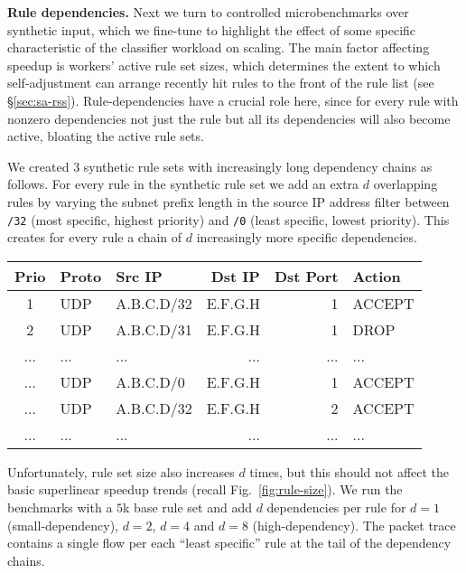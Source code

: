 \noindent%
\textbf{Rule dependencies.} %
Next we turn to controlled microbenchmarks over synthetic input, which we fine-tune to highlight the effect of some specific characteristic of the classifier workload on scaling. The main factor affecting speedup is workers' active rule set sizes, which determines the extent to which self-adjustment can arrange recently hit rules to the front of the rule list (see \S\ref{sec:sa-rss}). Rule-dependencies have a crucial role here, since for every rule with nonzero dependencies not just the rule but all its dependencies will also become active, bloating the active rule sets.

We created 3 synthetic rule sets with increasingly long dependency chains as follows. For every rule in the synthetic rule set we add an extra $d$ overlapping rules by varying the subnet prefix length in the source IP address filter between \texttt{/32} (most specific, highest priority) and \texttt{/0} (least specific, lowest priority). This creates for every rule a chain of $d$ increasingly more specific dependencies.

\noindent %
\begin{small}
  \addtolength{\tabcolsep}{-1pt}    
  \begin{tabular}{c|l|l|r|r|l}
    \textbf{Prio} & \textbf{Proto} & \textbf{Src IP} & \textbf{Dst IP} & \textbf{Dst Port} & \textbf{Action}\\
    \hline
    1 & UDP & A.B.C.D/32   & E.F.G.H  & 1  & ACCEPT\\
    2 & UDP & A.B.C.D/31   & E.F.G.H  & 1  & DROP\\
    ... & ... & ...   & ...  & ...  & ...\\
    ... & UDP & A.B.C.D/0   & E.F.G.H  & 1  & ACCEPT\\
    ... & UDP & A.B.C.D/32  & E.F.G.H  & 2  & ACCEPT\\
    ... & ... & ...   & ...  & ...  & ...\\
  \end{tabular}
  \addtolength{\tabcolsep}{1pt}    
\end{small}

\noindent %
Unfortunately, rule set size also increases $d$ times, but this should not affect the basic superlinear speedup trends (recall Fig.~\ref{fig:rule-size}). We run the benchmarks with a $5$k base rule set and add $d$ dependencies per rule for $d=1$ (small-dependency), $d=2$, $d=4$ and $d=8$ (high-dependency). The packet trace contains a single flow per each ``least specific'' rule at the tail of the dependency chains.  

